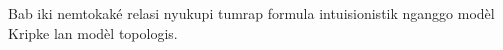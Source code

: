 \documentclass[../../../include/open-logic-chapter]{subfiles}
\begin{document}

\begin{editorial}
Bab iki nemtokaké relasi nyukupi tumrap formula intuisionistik nganggo modèl Kripke lan modèl topologis.
\end{editorial}


\OLEndChapterHook
\end{document}
